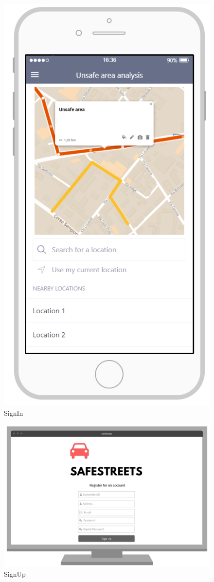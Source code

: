 \documentclass{article}
\begin{document}
\begin{figure}[H]
    \centering
    \includegraphics[scale=0.7]{Images/UnsafeAreaAnalysisAPP}
    \caption{SignIn}
\end{figure}
\begin{figure}[H]
    \centering
    \includegraphics[scale=0.35]{Images/WEBSignUp}
    \caption{SignUp}
\end{figure}
\end{document}
